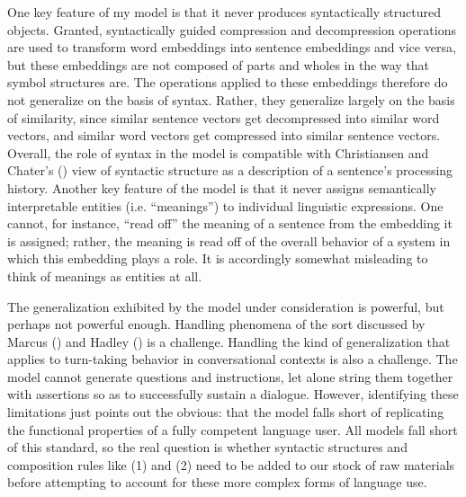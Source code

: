 One key feature of my model is that it never produces syntactically structured objects. Granted, syntactically guided compression and decompression operations are used to transform word embeddings into sentence embeddings and vice versa, but these embeddings are not composed of parts and wholes in the way that symbol structures are. The operations applied to these embeddings therefore do not generalize on the basis of syntax. Rather, they generalize largely on the basis of similarity, since similar sentence vectors get decompressed into similar word vectors, and similar word vectors get compressed into similar sentence vectors. Overall, the role of syntax in the model is compatible with Christiansen and Chater's (\citeyear{Christiansen:2015}) view of syntactic structure as a description of a sentence's processing history. Another key feature of the model is that it never assigns semantically interpretable entities (i.e. ``meanings'') to individual linguistic expressions. One cannot, for instance, ``read off'' the meaning of a sentence from the embedding it is assigned; rather, the meaning is read off of the overall behavior of a system in which this embedding plays a role. It is accordingly somewhat misleading to think of meanings as entities at all.
 
The generalization exhibited by the model under consideration is powerful, but perhaps not powerful enough. Handling phenomena of the sort discussed by Marcus (\citeyear{Marcus:1998}) and Hadley (\citeyear{Hadley:2009}) is a challenge. Handling the kind of generalization that applies to turn-taking behavior in conversational contexts is also a challenge. The model cannot generate questions and instructions, let alone string them together with assertions so as to successfully sustain a dialogue. However, identifying these limitations just points out the obvious: that the model falls short of replicating the functional properties of a fully competent language user. All models fall short of this standard, so the real question is whether syntactic structures and composition rules like (1) and (2) need to be added to our stock of raw materials before attempting to account for these more complex forms of language use. 

